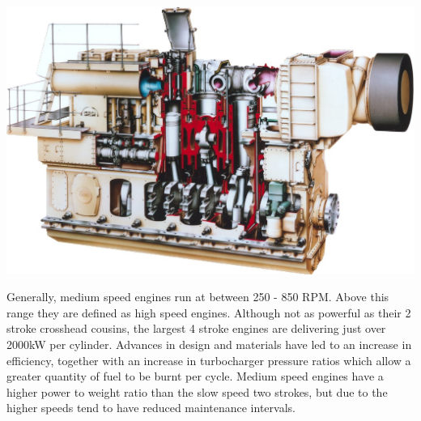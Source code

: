 \documentclass[11pt,a4paper]{article}
\begin{document}
\begin{center}
\includegraphics[width=15cm]{diesel.jpg}
\end{center}

Generally, medium speed engines run at between 250 - 850 RPM. Above this range they are defined as high speed engines. Although not as powerful as their 2 stroke crosshead cousins, the largest 4 stroke engines are delivering just over 2000kW per cylinder. Advances in  design and materials have led to an increase in efficiency, together with an increase in turbocharger pressure ratios which allow a greater quantity of fuel to be burnt per cycle. Medium speed engines have a higher power to weight ratio than the slow speed two strokes, but due to the higher speeds tend to have reduced maintenance intervals.\cite{m1}
\end{document}
